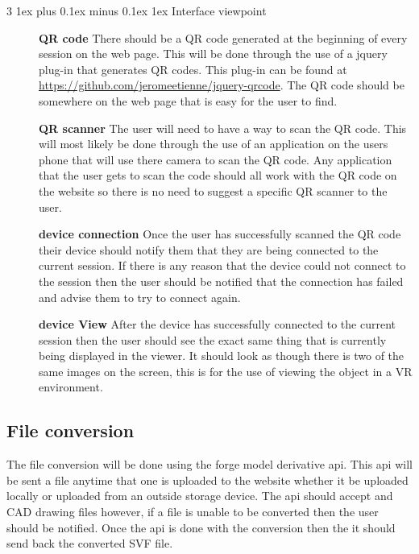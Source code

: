 \documentclass[letterpaper, 10pt, draftclsnofoot, compsoc, onecolumn]{IEEEtran}
\makeatletter
\def\subsubsection{\@startsection{subsubsection}%
                                 {3}%
                                 {\z@}%
                                 {1ex plus 0.1ex minus 0.1ex}%
                                 {1ex}%
                                 {\normalfont\normalsize}}%
\makeatother
\begin{document}
\subsubsection{Interface viewpoint}
\begin{description}
	\item[]\textbf{QR code} There should be a QR code generated at the beginning of every session on the web page. This will be done through the use of a jquery plug-in that generates QR codes. This plug-in can be found at \href{https://github.com/jeromeetienne/jquery-qrcode}{https://github.com/jeromeetienne/jquery-qrcode}. The QR code should be somewhere on the web page that is easy for the user to find. 
	\item[]\textbf{QR scanner} The user will need to have a way to scan the QR code. This will most likely be done through the use of an application on the users phone that will use there camera to scan the QR code. Any application that the user gets to scan the code should all work with the QR code on the website so there is no need to suggest a specific QR scanner to the user. 
	\item[]\textbf{device connection} Once the user has successfully scanned the QR code their device should notify them that they are being connected to the current session. If there is any reason that the device could not connect to the session then the user should be notified that the connection has failed and advise them to try to connect again.
	\item[]\textbf{device View} After the device has successfully connected to the current session then the user should see the exact same thing that is currently being displayed in the viewer. It should look as though there is two of the same images on the screen, this is for the use of viewing the object in a VR environment.  
\end{description}

\subsection{File conversion}
	The file conversion will be done using the forge model derivative api. This api will be sent a file anytime that one is uploaded to the website whether it be uploaded locally or uploaded from an outside storage device. The api should accept and CAD drawing files however, if a file is unable to be converted then the user should be notified. Once the api is done with the conversion then the it should send back the converted SVF file. 
\end{document}
